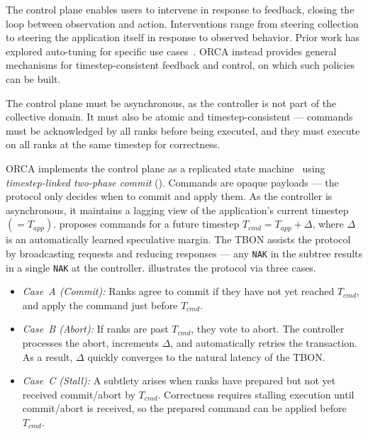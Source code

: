 \figDesignTwopc{}


The control plane enables users to intervene in response to feedback, closing the loop between
observation and action.
Interventions range from steering collection to steering the application itself in response to
observed behavior.
Prior work has explored auto-tuning for specific use cases~\cite{Bened2010:PERISCOPE}.
ORCA instead provides general mechanisms for timestep-consistent feedback and control, on which
such policies can be built.

The control plane must be asynchronous, as the controller is not part of the collective domain.
It must also be atomic and timestep-consistent --- commands must be acknowledged by all ranks
before being executed, and they must execute on all ranks at the same timestep for correctness.

ORCA implements the control plane as a replicated state machine~\cite{Schne1990:SMR} using
\emph{timestep-linked two-phase commit} (\twopc{}).
Commands are opaque payloads --- the protocol only decides when to commit and apply them.
As the controller is asynchronous, it maintains a lagging view of the application's current
timestep $(= T_{app})$.
\twopc{} proposes commands for a future timestep $T_{cmd} = T_{app} + \Delta$, where $\Delta$ is an
automatically learned speculative margin.
The TBON assists the protocol by broadcasting requests and reducing responses --- any \texttt{NAK}
in the subtree results in a single \texttt{NAK} at the controller.
 illustrates the protocol via three cases.

\begin{itemize}[leftmargin=*]
  \item \emph{Case~A (Commit):}
        Ranks agree to commit if they have not yet reached $T_{cmd}$, and apply the command just before
        $T_{cmd}$.
  \item \emph{Case~B (Abort):}
        If ranks are past $T_{cmd}$, they vote to abort.
        The controller processes the abort, increments $\Delta$, and automatically retries the transaction.
        As a result, $\Delta$ quickly converges to the natural latency of the TBON.
  \item \emph{Case~C (Stall):}
        A subtlety arises when ranks have prepared but not yet received commit/abort by $T_{cmd}$.
        Correctness requires stalling execution until commit/abort is received, so the prepared command can
        be applied before $T_{cmd}$.
\end{itemize}

